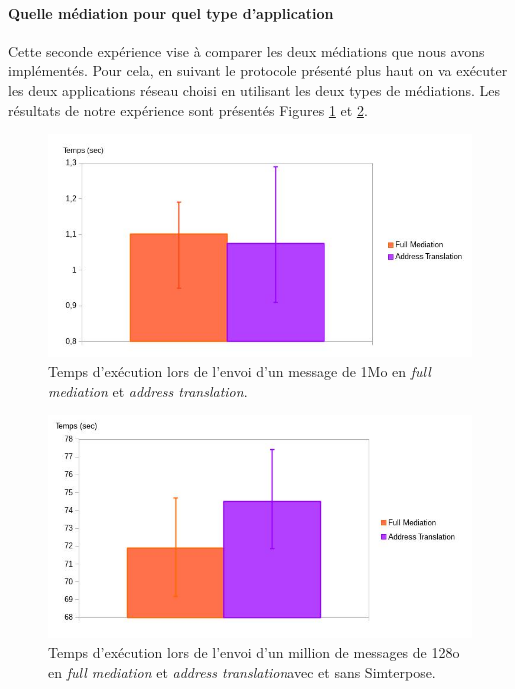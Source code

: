 \paragraph{Quelle médiation pour quel type d'application}
 Cette seconde expérience vise à comparer les deux médiations que nous avons implémentés. Pour cela, en suivant le protocole présenté plus haut on va exécuter les deux applications réseau choisi en utilisant les deux types de médiations. Les résultats de notre expérience sont présentés Figures \ref{Network_Big_Mediation} et \ref{Network_Little_Mediation}.

 \begin{figure}[H]
  \centering
    \includegraphics[scale=0.5]{mesures/graph/Bigmsg.jpg}
    \caption{Temps d'exécution lors de l'envoi d'un message de 1Mo en \textit{full mediation} et \textit{address translation}.}
    \label{Network_Big_Mediation}
\end{figure}

\begin{figure}[H]
  \centering
    \includegraphics[scale=0.5]{mesures/graph/Littlemsg.jpg}
    \caption{Temps d'exécution lors de l'envoi d'un million de messages de 128o en \textit{full mediation} et \textit{address translation}avec et sans Simterpose.}
    \label{Network_Little_Mediation}
\end{figure}

